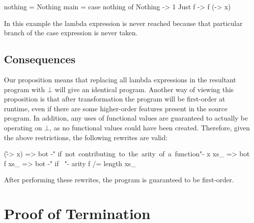 \documentclass[preprint]{sigplanconf}
\begin{document}
\begin{example}
\begin{code}
nothing = Nothing
main = case  nothing of
             Nothing  -> 1
             Just f   -> f (\x -> x)
\end{code}

In this example the lambda expression is never reached because that particular branch of the case expression is never taken.
\end{example}

\subsection{Consequences}

Our proposition means that replacing all lambda expressions in the resultant program with $\bot{}$ will give an identical program. Another way of viewing this proposition is that after transformation the program will be first-order at runtime, even if there are some higher-order features present in the source program. In addition, any uses of functional values are guaranteed to actually be operating on $\bot{}$, as no functional values could have been created. Therefore, given the above restrictions, the following rewrites are valid:

\ignore\begin{code}
(\v -> x)  => bot    {-"\hspace{3mm} \hbox{if not contributing to the arity of a function}"-}
x xs_      => bot
f xs_      => bot    {-"\hspace{3mm} \hbox{if } "-} arity f /= length xs_
\end{code}

After performing these rewrites, the program is guaranteed to be first-order.

\section{Proof of Termination}
\label{sec:termination}

\begin{comment}
We can remove all data types by encoding them as functions, as described in \citet{naylor:reduceron}. If we then had a transformation which made the program first-order \textit{without} introducing any data types, we would end up with a program without data or closures, which is incapable of storing an unbounded amount of information. Since with higher-order functions we can implement a Turing machine \cite{turing:halting}, and without an unbounded store we cannot, such a transformation cannot exist.
\end{comment}
\end{document}
